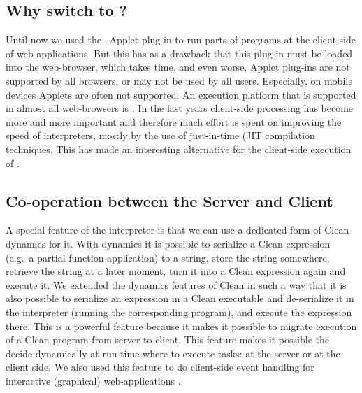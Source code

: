 \subsection{Why switch to \JS?}
Until now we used  the \Sapl\ \Java Applet plug-in to run parts of \Clean programs at the client side of web-applications.
But this has as a drawback that this plug-in must be loaded into the web-browser, which 
takes time, and  even worse, \Java Applet plug-ins are not supported by all browsers, 
or may not be used by all users.
Especially, on mobile devices \Java Applets are often not supported.
An execution platform that is supported in almost all web-browsers is \JS.
In the last years client-side processing has become more and more important and therefore
much effort is spent on improving the speed of \JS interpreters,
mostly by the use of just-in-time (\textsf{JIT} compilation techniques.
This has made \JS an interesting alternative for the client-side execution of \Sapl.

\subsection{Co-operation between the Server and Client}
A special feature of the \Sapl interpreter is that we can use a dedicated form of \textsf{Clean} 
dynamics \cite{DYNAMICS} for it. With dynamics it is possible to serialize a \textsf{Clean} expression 
(e.g.\ a partial function application) to a string, store the string somewhere, retrieve the string at a later moment, turn it into a 
\textsf{Clean} expression again and execute it. We extended the dynamics features of \textsf{Clean} in 
such a way that it is also possible to serialize an expression in a \textsf{Clean} executable and de-serialize it in the \Sapl interpreter (running the corresponding \Sapl program), and execute the 
expression there. This is a powerful feature because it makes it possible to migrate execution of a 
\textsf{Clean} program from server to client.  
This feature makes it possible the decide dynamically at run-time where to execute tasks:
at the server or at the client side.
We also used this feature to do client-side event handling for interactive (graphical) web-applications 
\cite{iEditors}. 

